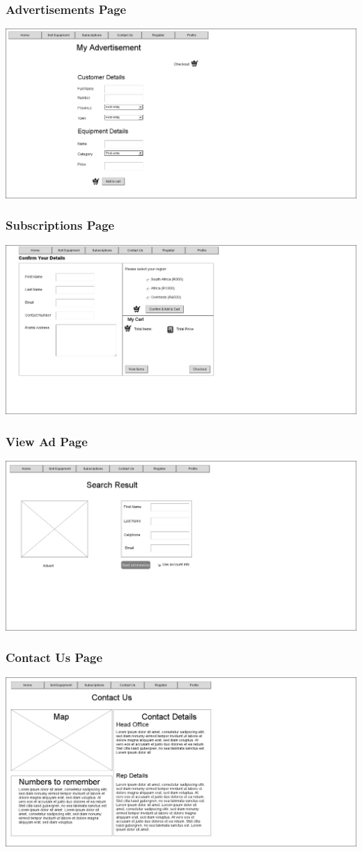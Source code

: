 \documentclass[11pt]{article}
\begin{document}
	\subsubsection{Advertisements Page}
		\includegraphics[width=0.75\linewidth]{../Images/Agrisales-AdvertisementsPage}
		
	\subsubsection{Subscriptions Page}
		\includegraphics[width=0.75\linewidth]{../Images/AgriSales-SubscriptionsPage}
		
	\subsubsection{View Ad Page}
		\includegraphics[width=0.75\linewidth]{../Images/AgriSales-ViewAdPage}
		
	\subsubsection{Contact Us Page}
		\includegraphics[width=0.75\linewidth]{../Images/Agrisales-ContactUsPage}
		
\end{document}
